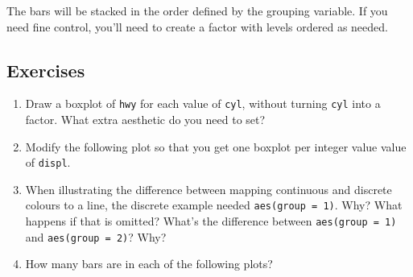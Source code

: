 The bars will be stacked in the order defined by the grouping variable.
If you need fine control, you'll need to create a factor with levels
ordered as needed.

\subsection{Exercises}\label{exercises-1}

\begin{enumerate}
\def\labelenumi{\arabic{enumi}.}
\item
  Draw a boxplot of \texttt{hwy} for each value of \texttt{cyl}, without
  turning \texttt{cyl} into a factor. What extra aesthetic do you need
  to set?
\item
  Modify the following plot so that you get one boxplot per integer
  value value of \texttt{displ}.

\begin{Shaded}
\begin{Highlighting}[]
\StringTok{ }
\StringTok{  }\NormalTok{()}
\end{Highlighting}
\end{Shaded}
\item
  When illustrating the difference between mapping continuous and
  discrete colours to a line, the discrete example needed
  \texttt{aes(group\ =\ 1)}. Why? What happens if that is omitted?
  What's the difference between \texttt{aes(group\ =\ 1)} and
  \texttt{aes(group\ =\ 2)}? Why?
\item
  How many bars are in each of the following plots?

\begin{Shaded}
\end{Shaded}


\end{enumerate}
